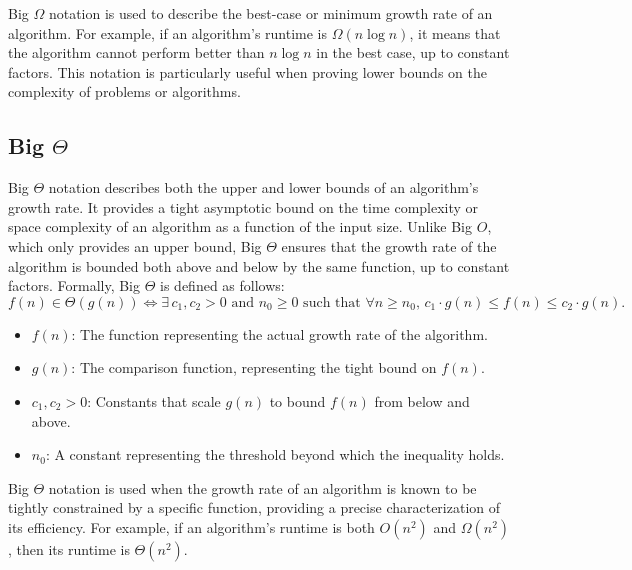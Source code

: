 Big $\Omega$ notation is used to describe the best-case or 
minimum growth rate of an algorithm. For example, if an 
algorithm's runtime is $\Omega(n \log n)$, it means that the 
algorithm cannot perform better than $n \log n$ in the best case, 
up to constant factors. This notation is particularly useful 
when proving lower bounds on the complexity of problems or algorithms.

\subsection{Big $\Theta$}
Big $\Theta$ notation describes both the upper and lower bounds 
of an algorithm's growth rate. It provides a tight asymptotic 
bound on the time complexity or space complexity of an algorithm 
as a function of the input size. Unlike Big $O$, which only provides 
an upper bound, Big $\Theta$ ensures that the growth rate of the 
algorithm is bounded both above and below by the same function, 
up to constant factors. Formally, Big $\Theta$ is defined as follows:
\[
f(n) \in \Theta(g(n)) \iff \exists \, c_1, c_2 > 0 \text{ and } n_0 \geq 0 \text{ such that } \forall n \geq n_0, \, c_1 \cdot g(n) \leq f(n) \leq c_2 \cdot g(n).
\]
\begin{itemize}
    \item $f(n)$: The function representing the actual growth rate of the algorithm.
    \item $g(n)$: The comparison function, representing the tight bound on $f(n)$.
    \item $c_1, c_2 > 0$: Constants that scale $g(n)$ to bound $f(n)$ from below and above.
    \item $n_0$: A constant representing the threshold beyond which the inequality holds.
\end{itemize}

Big $\Theta$ notation is used when the growth rate of an algorithm 
is known to be tightly constrained by a specific function, providing 
a precise characterization of its efficiency. For example, if an 
algorithm's runtime is both $O(n^2)$ and $\Omega(n^2)$, then its 
runtime is $\Theta(n^2)$.

